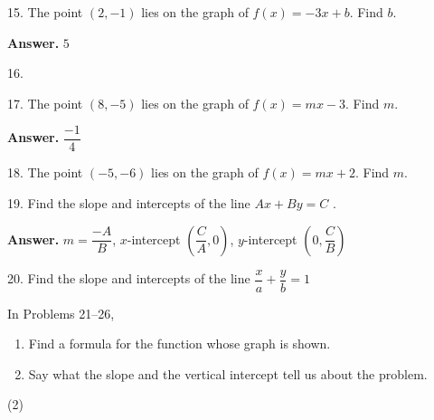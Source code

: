 \documentclass[10pt,]{book}
\theoremstyle{plain}
\theoremstyle{definition}
\theoremstyle{definition}
\theoremstyle{definition}
\theoremstyle{definition}
\numberwithin{equation}{part}
\begin{document}
\begin{exerciselist}
\item[15.]\hypertarget{exercise-301}{}The point \((2, -1)\) lies on the graph of \(f (x) = -3x + b\). Find \(b\).%
\par\smallskip
\par\smallskip
\noindent\textbf{Answer.}\hypertarget{answer-171}{}\quad
\(5\)%
\item[16.]\hypertarget{exercise-302}{}\par\smallskip
\item[17.]\hypertarget{exercise-303}{}The point \((8, -5)\) lies on the graph of \(f(x) = mx - 3\). Find \(m\).%
\par\smallskip
\par\smallskip
\noindent\textbf{Answer.}\hypertarget{answer-172}{}\quad
\(\dfrac{-1}{4} \)%
\item[18.]\hypertarget{exercise-304}{}The point \((-5, -6)\) lies on the graph of \(f(x) = mx +2\). Find \(m\).%
\par\smallskip
\item[19.]\hypertarget{exercise-305}{}Find the slope and intercepts of the line \(Ax + By = C\) .%
\par\smallskip
\par\smallskip
\noindent\textbf{Answer.}\hypertarget{answer-173}{}\quad
\(m =\dfrac{-A}{B}\), \(x\)-intercept \(\left(\dfrac{C}{A},0\right) \), \(y\)-intercept \(\left(0,\dfrac{C}{B}\right) \)%
\item[20.]\hypertarget{exercise-306}{}Find the slope and intercepts of the line \(\dfrac{x}{a}+\dfrac{y}{b}=1 \)%
\par\smallskip
\hypertarget{exercisegroup-38}{}\par\noindent In Problems 21–26, \leavevmode%
\begin{enumerate}[label=*\alph**]
\item\hypertarget{li-1168}{}Find a formula for the function whose graph is shown.%
\item\hypertarget{li-1169}{}Say what the slope and the vertical intercept tell us about the problem.%
\end{enumerate}
%
\begin{exercisegroup}(2)

\end{exercisegroup}
\end{exerciselist}
\end{document}
